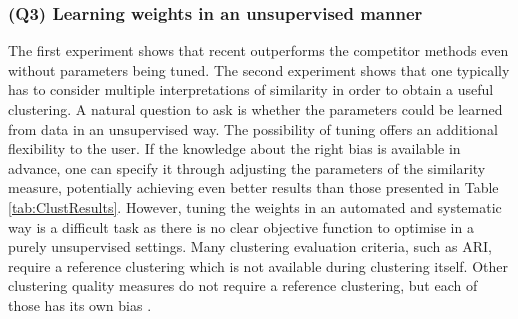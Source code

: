 








\subsubsection{\textbf{(Q3) Learning weights in an unsupervised manner}}

The first experiment shows that \gls{recent} outperforms the competitor methods even without parameters being tuned.
The second experiment shows that one typically has to consider multiple interpretations of similarity in order to obtain a useful clustering.
A natural question to ask is whether the  parameters could be learned from data in an unsupervised way.
The possibility of tuning offers an additional flexibility to the user.
If the knowledge about the right bias is available in advance, one can specify it through adjusting the parameters of the similarity measure, potentially achieving even better results than those presented in Table \ref{tab:ClustResults}.
However, tuning the weights in an automated and systematic way is a difficult task as there is no clear objective function to optimise in a purely unsupervised settings.
Many clustering evaluation criteria, such as ARI, require a reference clustering which is not available during clustering itself.  Other clustering quality measures do not require a reference clustering, but each of those has its own bias \cite{VanCraenendonck15}.


